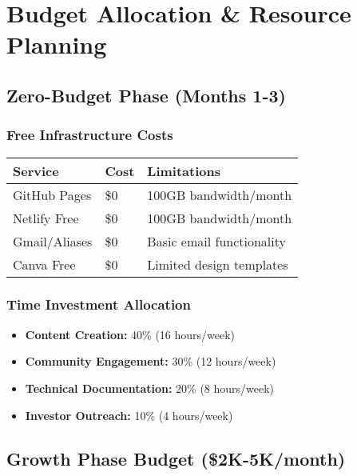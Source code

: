 \documentclass[12pt,a4paper]{article}
\begin{document}
\section{Budget Allocation \& Resource Planning}

\subsection{Zero-Budget Phase (Months 1-3)}

\subsubsection{Free Infrastructure Costs}
\begin{center}
\begin{tabular}{|l|l|l|}
\hline
\textbf{Service} & \textbf{Cost} & \textbf{Limitations} \\
\hline
GitHub Pages & \$0 & 100GB bandwidth/month \\
Netlify Free & \$0 & 100GB bandwidth/month \\
Gmail/Aliases & \$0 & Basic email functionality \\
Canva Free & \$0 & Limited design templates \\
\hline
\end{tabular}
\end{center}

\subsubsection{Time Investment Allocation}
\begin{itemize}
    \item \textbf{Content Creation:} 40\% (16 hours/week)
    \item \textbf{Community Engagement:} 30\% (12 hours/week)
    \item \textbf{Technical Documentation:} 20\% (8 hours/week)
    \item \textbf{Investor Outreach:} 10\% (4 hours/week)
\end{itemize}

\subsection{Growth Phase Budget (\$2K-5K/month)}
\end{document}
